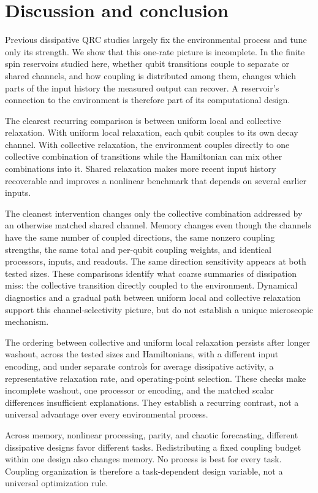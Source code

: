 \section{Discussion and conclusion}
\label{sec:discussion}

Previous dissipative QRC studies largely fix the environmental process and tune
only its strength. We show that this one-rate picture is incomplete. In the
finite spin reservoirs studied here, whether qubit transitions couple to
separate or shared channels, and how coupling is distributed among them,
changes which parts of the input history the measured output can recover. A
reservoir's connection to the environment is therefore part of its
computational design.

The clearest recurring comparison is between uniform local and collective
relaxation. With uniform local relaxation, each qubit couples to its own decay
channel. With collective relaxation, the environment couples directly to one
collective combination of transitions while the Hamiltonian can mix other
combinations into it. Shared relaxation makes more recent input history
recoverable and improves a nonlinear benchmark that depends on several earlier
inputs.

The cleanest intervention changes only the collective combination addressed by
an otherwise matched shared channel. Memory changes even though the channels
have the same number of coupled directions, the same nonzero coupling
strengths, the same total and per-qubit coupling weights, and identical
processors, inputs, and readouts. The same direction sensitivity appears at
both tested sizes. These comparisons identify what coarse summaries of
dissipation miss: the collective transition directly coupled to the
environment. Dynamical diagnostics and a gradual path between uniform local and
collective relaxation support this channel-selectivity picture, but do not
establish a unique microscopic mechanism.

The ordering between collective and uniform local relaxation persists after longer washout, across the
tested sizes and Hamiltonians, with a different input encoding, and under
separate controls for average dissipative activity, a representative relaxation
rate, and operating-point selection. These checks make incomplete washout, one
processor or encoding, and the matched scalar differences insufficient
explanations. They establish a recurring contrast, not a universal advantage
over every environmental process.

Across memory, nonlinear processing, parity, and chaotic forecasting, different
dissipative designs favor different tasks. Redistributing a fixed coupling
budget within one design also changes memory. No process is best for every task.
Coupling organization is therefore a task-dependent design variable, not a
universal optimization rule.

